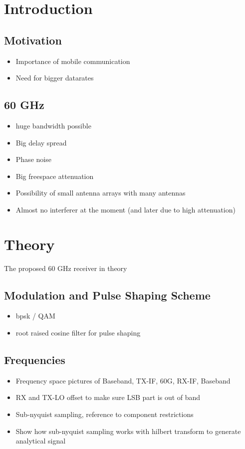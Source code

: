 \chapter{Introduction}

\section{Motivation}
\begin{itemize}
\item Importance of mobile communication
\item Need for bigger datarates
\end{itemize}

\section{60 GHz}
\begin{itemize}
\item huge bandwidth possible
\item Big delay spread
\item Phase noise
\item Big freespace attenuation
\item Possibility of small antenna arrays with many antennas
\item Almost no interferer at the moment (and later due to high attenuation)
\end{itemize}

\chapter{Theory}
The proposed 60 GHz receiver in theory

\section{Modulation and Pulse Shaping Scheme}
\begin{itemize}
\item bpsk / QAM
\item root raised cosine filter for pulse shaping
\end{itemize}

\section{Frequencies}
\begin{itemize}
\item Frequency space pictures of Baseband, TX-IF, 60G, RX-IF, Baseband
\item RX and TX-LO offset to make sure LSB part is out of band
\item Sub-nyquist sampling, reference to component restrictions
\item Show how sub-nyquist sampling works with hilbert transform to generate analytical signal
\end{itemize}

